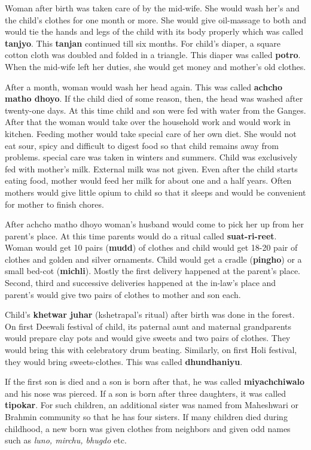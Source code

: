 Woman after birth was taken care of by the mid-wife. She would wash her's and
the child's clothes for one month or more. She would give oil-massage to both
and would tie the hands and legs of the child with its body properly which was
called \textbf{tanjyo}. This \textbf{tanjan} continued till six months. For
child's diaper, a square cotton cloth was doubled and folded in a triangle.
This diaper was called \textbf{potro}. When the mid-wife left her duties, she
would get money and mother's old clothes.

After a month, woman would wash her head again. This was called \textbf{achcho
matho dhoyo}. If the child died of some reason, then, the head was washed after
twenty-one days. At this time child and son were fed with water from the
Ganges. After that the woman would take over the household work and would work
in kitchen. Feeding mother would take special care of her own diet. She would
not eat sour, spicy and difficult to digest food so that child remains away
from problems. special care was taken in winters and summers. Child was
exclusively fed with mother's milk. External milk was not given. Even after the
child starts eating food, mother would feed her milk for about one and a half
years. Often mothers would give little opium to child so that it sleeps and
would be convenient for mother to finish chores.

After achcho matho dhoyo woman's husband would come to pick her up from her
parent's place. At this time parents would do a ritual called
\textbf{suat-ri-reet}. Woman would get 10 pairs (\textbf{mudd}) of clothes and
child would get 18-20 pair of clothes and golden and silver ornaments. Child
would get a cradle (\textbf{pingho}) or a small bed-cot (\textbf{michli}).
Mostly the first delivery happened at the parent's place. Second, third and
successive deliveries happened at the in-law's place and parent's would give
two pairs of clothes to mother and son each.

Child's \textbf{khetwar juhar} (kshetrapal's ritual) after birth was done in
the forest. On first Deewali festival of child, its paternal aunt and maternal
grandparents would prepare clay pots and would give sweets and two pairs of
clothes. They would bring this with celebratory drum beating. Similarly, on
first Holi festival, they would bring sweets-clothes. This was called
\textbf{dhundhaniyu}.

If the first son is died and a son is born after that, he was called
\textbf{miyachchiwalo} and his nose was pierced. If a son is born after three
daughters, it was called \textbf{tipokar}. For such children, an additional
sister was named from Maheshwari or Brahmin community so that he has four
sisters. If many children died during childhood, a new born was given clothes
from neighbors and given odd names such as \textit{luno, mirchu, bhugdo} etc.

